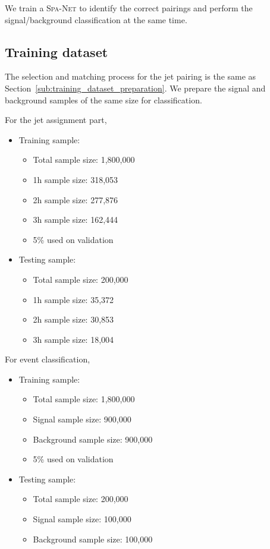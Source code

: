 \documentclass[12pt]{article}
\begin{document}
	We train a \textsc{Spa-Net} to identify the correct pairings and perform the signal/background classification at the same time.

	\subsection{Training dataset}%
	\label{sub:training_dataset_classification}
		The selection and matching process for the jet pairing is the same as Section~\ref{sub:training_dataset_preparation}. We prepare the signal and background samples of the same size for classification.

		For the jet assignment part,
		\begin{itemize}
			\item Training sample:
			\begin{itemize}
				\item Total sample size: 1,800,000
				\item 1h sample size: 318,053
				\item 2h sample size: 277,876
				\item 3h sample size: 162,444
				\item 5\% used on validation
			\end{itemize}
			\item Testing sample:
			\begin{itemize}
				\item Total sample size: 200,000
				\item 1h sample size: 35,372
				\item 2h sample size: 30,853
				\item 3h sample size: 18,004
			\end{itemize}
		\end{itemize}

		For event classification,
		\begin{itemize}
			\item Training sample:
			\begin{itemize}
				\item Total sample size: 1,800,000
				\item Signal sample size: 900,000
				\item Background sample size: 900,000
				\item 5\% used on validation
			\end{itemize}
			\item Testing sample:
			\begin{itemize}
				\item Total sample size: 200,000
				\item Signal sample size: 100,000
				\item Background sample size: 100,000
			\end{itemize}
		\end{itemize}
\end{document}
